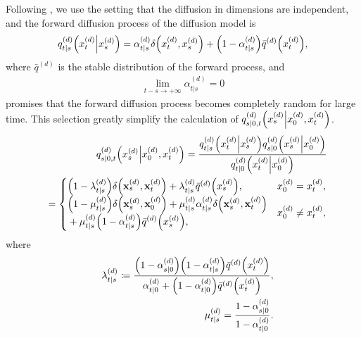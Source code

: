 \documentclass{article}
\begin{document}
Following \cite{zhao2024unified}, we use the setting that the diffusion in dimensions are independent, and the forward diffusion process of the diffusion model is
\begin{eqnarray}\label{eq:InterpolarQ}
  q^{(d)}_{t|s}\qty(x^{(d)}_t\middle|x^{(d)}_s) = \alpha^{(d)}_{t|s} \delta\qty(x^{(d)}_t, x^{(d)}_s) + \qty(1 - \alpha^{(d)}_{t|s})\bar{q}^{(d)}\qty(x^{(d)}_t),
\end{eqnarray}
where $\bar{q}^{(d)}$ is the stable distribution of the forward process, and
\begin{eqnarray*}
\lim_{t-s\to+\infty}\alpha^{(d)}_{t|s} = 0
\end{eqnarray*}
promises that the forward diffusion process becomes completely random for large time. This selection greatly simplify the calculation of $q^{(d)}_{s|0,t}\qty(x^{(d)}_s\middle|x^{(d)}_0,x^{(d)}_t)$\cite{zhao2024unified}.
\begin{eqnarray}\label{eq:sOn0tq}
&&q^{(d)}_{s|0,t}\qty(x^{(d)}_s\middle|x^{(d)}_0, x^{(d)}_t)=\frac{q^{(d)}_{t|s}\qty(x^{(d)}_t\middle|x^{(d)}_s)q^{(d)}_{s|0}\qty(x^{(d)}_s\middle|x^{(d)}_0)}{q^{(d)}_{t|0}\qty(x^{(d)}_t\middle|x^{(d)}_0)}\nonumber\\
&&=\begin{cases}
    \qty(1-\lambda^{(d)}_{t|s})\delta\qty(\mathbf{x}^{(d)}_s, \mathbf{x}^{(d)}_t) + \lambda^{(d)}_{t|s}\bar{q}^{(d)}\qty(x^{(d)}_s), & x_0^{(d)}=x^{(d)}_t,\\
    \begin{aligned}
      &\qty(1-\mu^{(d)}_{t|s})\delta\qty(\mathbf{x}^{(d)}_s, \mathbf{x}^{(d)}_0) + \mu^{(d)}_{t|s}\alpha^{(d)}_{t|s}\delta\qty(\mathbf{x}^{(d)}_s, \mathbf{x}^{(d)}_t) \\
      &+ \mu^{(d)}_{t|s}\qty(1-\alpha^{(d)}_{t|s})\bar{q}^{(d)}\qty(x^{(d)}_s),
    \end{aligned}
    & x_0^{(d)}\neq x_t^{(d)},
\end{cases}
\end{eqnarray}
where
\begin{eqnarray*}
    &&\lambda^{(d)}_{t|s}\coloneq\frac{\qty(1-\alpha^{(d)}_{s|0})\qty(1-\alpha^{(d)}_{t|s})\bar{q}^{(d)}\qty(x^{(d)}_t)}{\alpha^{(d)}_{t|0} + \qty(1-\alpha^{(d)}_{t|0})\bar{q}^{(d)}\qty(x^{(d)}_t)},\\
    &&\mu^{(d)}_{t|s}=\frac{1-\alpha^{(d)}_{s|0}}{1-\alpha^{(d)}_{t|0}}.
\end{eqnarray*}
\end{document}

